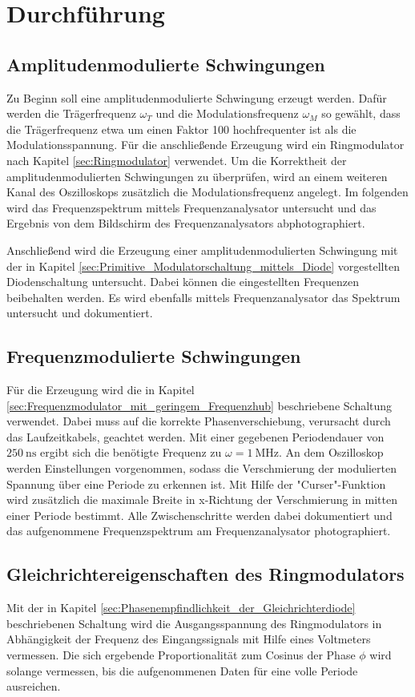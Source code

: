 \section{Durchführung}
\label{sec:Durchführung}

\subsection{Amplitudenmodulierte Schwingungen}
Zu Beginn soll eine amplitudenmodulierte Schwingung erzeugt werden. Dafür werden die Trägerfrequenz $\omega_T$ und die Modulationsfrequenz $\omega_M$ so gewählt, dass die Trägerfrequenz etwa um einen Faktor 100 hochfrequenter ist als die Modulationsspannung. Für die anschließende Erzeugung wird ein Ringmodulator nach Kapitel \ref{sec:Ringmodulator} verwendet. Um die Korrektheit der amplitudenmodulierten Schwingungen zu überprüfen, wird an einem weiteren Kanal des Oszilloskops zusätzlich die Modulationsfrequenz angelegt. Im folgenden wird das Frequenzspektrum mittels Frequenzanalysator untersucht und das Ergebnis von dem Bildschirm des Frequenzanalysators abphotographiert.

Anschließend wird die Erzeugung einer amplitudenmodulierten Schwingung mit der in Kapitel \ref{sec:Primitive_Modulatorschaltung_mittels_Diode} vorgestellten Diodenschaltung untersucht. Dabei können die eingestellten Frequenzen beibehalten werden. Es wird ebenfalls mittels Frequenzanalysator das Spektrum untersucht und dokumentiert.

\subsection{Frequenzmodulierte Schwingungen}
Für die Erzeugung wird die in Kapitel \ref{sec:Frequenzmodulator_mit_geringem_Frequenzhub} beschriebene Schaltung verwendet. Dabei muss auf die korrekte Phasenverschiebung, verursacht durch das Laufzeitkabels, geachtet werden. Mit einer gegebenen Periodendauer von $\SI{250}{\ns}$ ergibt sich die benötigte Frequenz zu $\omega=\SI{1}{\mega\hertz}$. An dem Oszilloskop werden Einstellungen vorgenommen, sodass die Verschmierung der modulierten Spannung über eine Periode zu erkennen ist. Mit Hilfe der "Curser"-Funktion wird zusätzlich die maximale Breite in x-Richtung der Verschmierung in mitten einer Periode bestimmt. Alle Zwischenschritte werden dabei dokumentiert und das aufgenommene Frequenzspektrum am Frequenzanalysator photographiert.

\subsection{Gleichrichtereigenschaften des Ringmodulators}
Mit der in Kapitel \ref{sec:Phasenempfindlichkeit_der_Gleichrichterdiode} beschriebenen Schaltung wird die Ausgangsspannung des Ringmodulators in Abhängigkeit der Frequenz des Eingangssignals mit Hilfe eines Voltmeters vermessen. Die sich ergebende Proportionalität zum Cosinus der Phase $\phi$ wird solange vermessen, bis die aufgenommenen Daten für eine volle Periode ausreichen.

